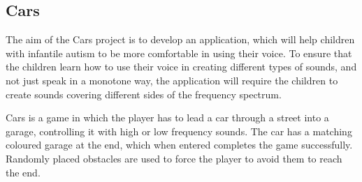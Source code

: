 \subsection{Cars}
\label{sub:cars}
The aim of the Cars project is to develop an application, which will help children with infantile autism to be more comfortable in using their voice. To ensure that the children learn how to use their voice in creating different types of sounds, and not just speak in a monotone way, the application will require the children to create sounds covering different sides of the frequency spectrum.

Cars is a game in which the player has to lead a car through a street into a garage, controlling it with high or low frequency sounds. The car has a matching coloured garage at the end, which when entered completes the game successfully.
Randomly placed obstacles are used to force the player to avoid them to reach the end.

